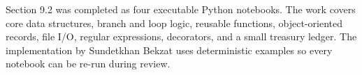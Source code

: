 Section 9.2 was completed as four executable Python notebooks. The work covers core data structures, branch and loop logic, reusable functions, object-oriented records, file I/O, regular expressions, decorators, and a small treasury ledger. The implementation by Sundetkhan Bekzat uses deterministic examples so every notebook can be re-run during review.
